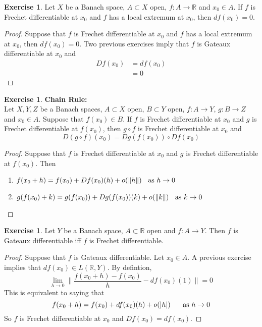 \documentclass[12pt]{amsart}
\theoremstyle{definition}
\newtheorem{ex}[definition]{Exercise}
\newcommand{\R}{\mathbb{R}}
\begin{document}
	\begin{ex}
	Let $X$ be a Banach space, $A \subset X$ open, $f:A \rightarrow \R$ and $x_0 \in A$. If $f$ is Frechet differentiable at $x_0$ and $f$ has a local extremum at $x_0$, then $df(x_0) = 0$.
	\end{ex}	
	
	\begin{proof}
	Suppose that $f$ is Frechet differentiable at $x_0$ and $f$ has a local extremum at $x_0$, then $df(x_0) = 0$. Two previous exercises imply that $f$ is Gateaux differentiable at $x_0$ and 
	\begin{align*}
	Df(x_0) 
	&= df(x_0) \\
	&= 0
	\end{align*}	
	\end{proof}
	
	
	\begin{ex}\textbf{Chain Rule:}\\
	Let $X, Y, Z$ be a Banach spaces, $A \subset X$ open, $B \subset Y$ open, $f:A \rightarrow Y$, $g:B \rightarrow Z$ and $x_0 \in A$. Suppose that $f(x_0) \in B$. If $f$ is Frechet differentiable at $x_0$ and $g$ is Frechet differentiable at $f(x_0)$, then $g \circ f$ is Frechet differentiable at $x_0$ and $$D(g \circ f)(x_0) = Dg(f(x_0)) \circ Df(x_0)$$
	\end{ex}
	
	\begin{proof}
	Suppose that $f$ is Frechet differentiable at $x_0$ and $g$ is Frechet differentiable at $f(x_0)$. Then 
	\begin{enumerate}
	\item $f(x_0 + h) = f(x_0) + Df(x_0)(h) + o(\|h\|) \hspace{.2cm } \text{ as } h \rightarrow 0 $
	\item $g(f(x_0) + k) = g(f(x_0)) + Dg(f(x_0))(k) + o(\|k\|) \hspace{.2cm } \text{ as } k \rightarrow 0 $
	\end{enumerate}
	\end{proof}
	
	\begin{ex}
	Let $Y$ be a Banach space, $A \subset \R$ open and $f:A \rightarrow Y$. Then $f$ is Gateaux differentiable iff $f$ is Frechet differentiable.
	\end{ex}
	
	\begin{proof}
	Suppose that $f$ is Gateaux differentiable. Let $x_0 \in A$. A previous exercise implies that $df(x_0) \in L(\R, Y)$. By defintion, $$  \lim_{h \rightarrow 0} \bigg \| \frac{f(x_0 + h) - f(x_0)}{h} - df(x_0)(1) \bigg \| = 0$$ 
	This is equivalent to saying that $$f(x_0 + h) = f(x_0) + df(x_0)(h) + o(|h|) \hspace{.5cm} \text{ as } h \rightarrow 0$$
	So $f$ is Frechet differentiable at $x_0$ and $Df(x_0) = df(x_0)$.
	\end{proof}
	
\end{document}

